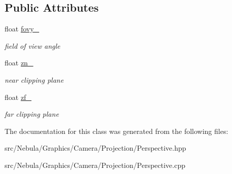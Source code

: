 \subsection*{\-Public \-Attributes}
\begin{DoxyCompactItemize}
\item 
\hypertarget{classNeb_1_1Camera_1_1Projection_1_1Perspective_acd963786dcbf15670368dcf0eed43536}{float \hyperlink{classNeb_1_1Camera_1_1Projection_1_1Perspective_acd963786dcbf15670368dcf0eed43536}{fovy\-\_\-}}\label{classNeb_1_1Camera_1_1Projection_1_1Perspective_acd963786dcbf15670368dcf0eed43536}

\begin{DoxyCompactList}\small\item\em field of view angle \end{DoxyCompactList}\item 
\hypertarget{classNeb_1_1Camera_1_1Projection_1_1Perspective_a86580bab97702e0ca4d0f0bf19a1fa65}{float \hyperlink{classNeb_1_1Camera_1_1Projection_1_1Perspective_a86580bab97702e0ca4d0f0bf19a1fa65}{zn\-\_\-}}\label{classNeb_1_1Camera_1_1Projection_1_1Perspective_a86580bab97702e0ca4d0f0bf19a1fa65}

\begin{DoxyCompactList}\small\item\em near clipping plane \end{DoxyCompactList}\item 
\hypertarget{classNeb_1_1Camera_1_1Projection_1_1Perspective_a5ad4e81260a9a1a38cd0d7ed23979184}{float \hyperlink{classNeb_1_1Camera_1_1Projection_1_1Perspective_a5ad4e81260a9a1a38cd0d7ed23979184}{zf\-\_\-}}\label{classNeb_1_1Camera_1_1Projection_1_1Perspective_a5ad4e81260a9a1a38cd0d7ed23979184}

\begin{DoxyCompactList}\small\item\em far clipping plane \end{DoxyCompactList}\end{DoxyCompactItemize}


\-The documentation for this class was generated from the following files\-:\begin{DoxyCompactItemize}
\item 
src/\-Nebula/\-Graphics/\-Camera/\-Projection/\-Perspective.\-hpp\item 
src/\-Nebula/\-Graphics/\-Camera/\-Projection/\-Perspective.\-cpp\end{DoxyCompactItemize}
